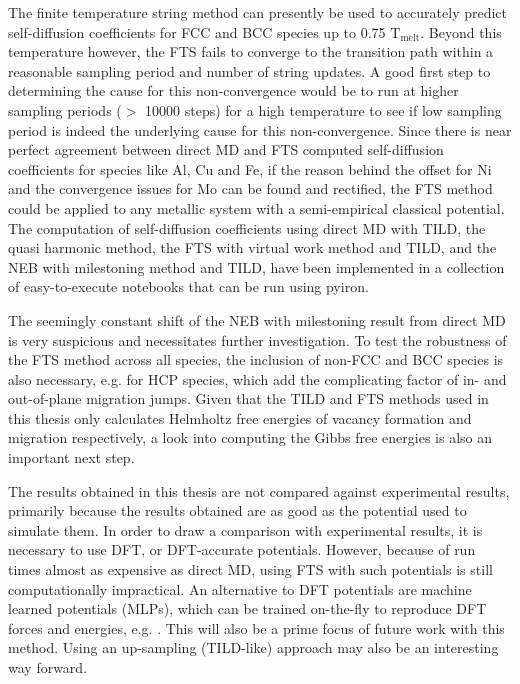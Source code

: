 \documentclass{article}
\begin{document}
The finite temperature string method can presently be used to accurately predict self-diffusion coefficients for FCC and BCC species up to 0.75 $\mathrm{T_{melt}}$. Beyond this temperature however, the FTS fails to converge to the transition path within a reasonable sampling period and number of string updates. A good first step to determining the cause for this non-convergence would be to run at higher sampling periods ($>$ 10000 steps) for a high temperature to see if low sampling period is indeed the underlying cause for this non-convergence. Since there is near perfect agreement between direct MD and FTS computed self-diffusion coefficients for species like Al, Cu and Fe, if the reason behind the offset for Ni and the convergence issues for Mo can be found and rectified, the FTS method could be applied to any metallic system with a semi-empirical classical potential. The computation of self-diffusion coefficients using direct MD with TILD, the quasi harmonic method, the FTS with virtual work method and TILD, and the NEB with milestoning method and TILD, have been implemented in a collection of easy-to-execute notebooks that can be run using pyiron. 

The seemingly constant shift of the NEB with milestoning result from direct MD is very suspicious and necessitates further investigation. To test the robustness of the FTS method across all species, the inclusion of non-FCC and BCC species is also necessary, e.g. for HCP species, which add the complicating factor of in- and out-of-plane migration jumps. Given that the TILD and FTS methods used in this thesis only calculates Helmholtz free energies of vacancy formation and migration respectively, a look into computing the Gibbs free energies is also an important next step. 

The results obtained in this thesis are not compared against experimental results, primarily because the results obtained are as good as the potential used to simulate them. In order to draw a comparison with experimental results, it is necessary to use DFT, or DFT-accurate potentials. However, because of run times almost as expensive as direct MD, using FTS with such potentials is still computationally impractical. An alternative to DFT potentials are machine learned potentials (MLPs), which can be trained on-the-fly to reproduce DFT forces and energies, e.g. \cite{Gubaev2018}. This will also be a prime focus of future work with this method. Using an up-sampling (TILD-like) approach \cite{Duff2015} may also be an interesting way forward.
\end{document}
